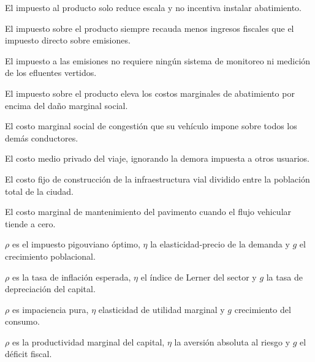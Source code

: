\begin{opts}
    \item El impuesto al producto solo reduce escala y no incentiva instalar abatimiento.
    \item El impuesto sobre el producto siempre recauda menos ingresos fiscales que el impuesto directo sobre emisiones.
    \item El impuesto a las emisiones no requiere ningún sistema de monitoreo ni medición de los efluentes vertidos.
    \item El impuesto sobre el producto eleva los costos marginales de abatimiento por encima del daño marginal social.
\end{opts}

\begin{opts}
    \item El costo marginal social de congestión que su vehículo impone sobre todos los demás conductores.
    \item El costo medio privado del viaje, ignorando la demora impuesta a otros usuarios.
    \item El costo fijo de construcción de la infraestructura vial dividido entre la población total de la ciudad.
    \item El costo marginal de mantenimiento del pavimento cuando el flujo vehicular tiende a cero.
\end{opts}

\begin{opts}
    \item $\rho$ es el impuesto pigouviano óptimo, $\eta$ la elasticidad-precio de la demanda y $g$ el crecimiento poblacional.
    \item $\rho$ es la tasa de inflación esperada, $\eta$ el índice de Lerner del sector y $g$ la tasa de depreciación del capital.
    \item $\rho$ es impaciencia pura, $\eta$ elasticidad de utilidad marginal y $g$ crecimiento del consumo.
    \item $\rho$ es la productividad marginal del capital, $\eta$ la aversión absoluta al riesgo y $g$ el déficit fiscal.
\end{opts}

